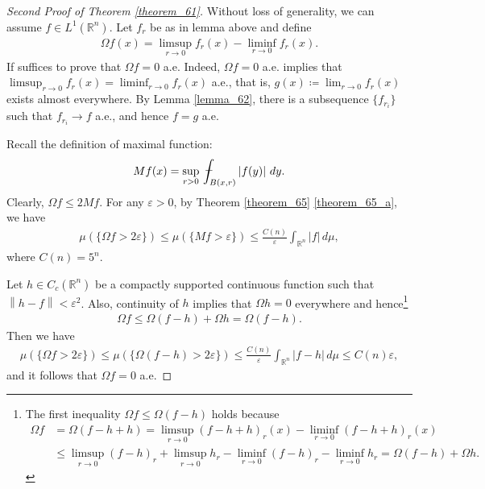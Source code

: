 \documentclass[11pt]{book}
\theoremstyle{definition}
\numberwithin{equation}{chapter}
\def\avint{\,\ThisStyle{\ensurestackMath{%
  \stackinset{c}{.2\LMpt}{c}{1\LMpt}{\SavedStyle-}{\SavedStyle\phantom{\int}}}%
  \setbox0=\hbox{$\SavedStyle\int\,$}\kern-\wd0}\int}
\begin{document}
\begin{proof}[Second Proof of Theorem \ref{theorem_61}]
Without loss of generality, we can assume $f \in L^1(\mathbb{R}^n)$. Let $f_r$ be as in lemma above and define
\begin{align*}
    \Omega f(x) = \limsup_{r\to 0} f_r(x) - \liminf_{r\to 0} f_r(x).
\end{align*}
If suffices to prove that $\Omega f = 0$ a.e. Indeed, $\Omega f = 0$ a.e. implies that $\limsup_{r\to 0} f_r(x) = \liminf_{r\to 0} f_r(x)$ a.e., that is, $g(x) \coloneqq \lim_{r\to 0} f_r(x)$ exists almost everywhere. By Lemma \ref{lemma_62}, there is a subsequence $\{f_{r_i}\}$ such that $f_{r_i} \to f$ a.e., and hence $f = g$ a.e.

Recall the definition of maximal function:
\begin{align*}
    Mf(x) = \sup_{r > 0} \avint_{B(x,r)} \left|f(y)\right| \,dy.
\end{align*}
Clearly, $\Omega f \leq 2Mf$. For any $\varepsilon > 0$, by Theorem \ref{theorem_65} \ref{theorem_65_a}, we have
\begin{align*}
    \mu(\{\Omega f > 2\varepsilon\}) \leq \mu(\{Mf > \varepsilon\}) \leq \frac{C(n)}{\varepsilon} \int_{\mathbb{R}^n} \left|f\right| \,d\mu,
\end{align*}
where $C(n) = 5^n$. 

Let $h \in C_c(\mathbb{R}^n)$ be a compactly supported continuous function such that $\left\|h - f\right\| < \varepsilon^2$. Also, continuity of $h$ implies that $\Omega h = 0$ everywhere and hence\footnote{The first inequality $\Omega f \leq \Omega (f - h)$ holds because \begin{align*}
    \Omega f & = \Omega (f - h + h) = \limsup_{r\to 0} (f - h + h)_r(x) - \liminf_{r\to 0} (f - h + h)_r(x)
    \\
    & \leq \limsup_{r\to 0} (f-h)_r + \limsup_{r\to 0} h_r - \liminf_{r\to 0} (f-h)_r - \liminf_{r\to 0} h_r = \Omega (f - h) + \Omega h.
\end{align*}}
\begin{align*}
    \Omega f \leq \Omega (f - h) + \Omega h = \Omega (f - h).
\end{align*}
Then we have
\begin{align*}
    \mu(\{\Omega f > 2\varepsilon\}) \leq \mu(\{\Omega (f - h) > 2\varepsilon\}) \leq \frac{C(n)}{\varepsilon} \int_{\mathbb{R}^n} \left|f - h\right| \,d\mu \leq C(n) \varepsilon,
\end{align*}
and it follows that $\Omega f = 0$ a.e.
\end{proof}
\end{document}
